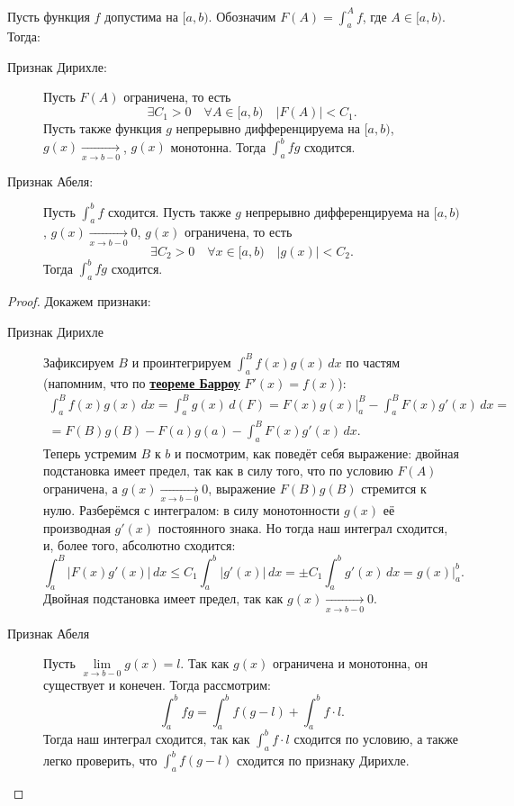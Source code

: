 \begin{theorem}
	Пусть функция \(f\) допустима на \([a, b)\). Обозначим \(F(A) = \int_a^A f\), где \(A \in [a, b)\). Тогда:
	\begin{description}
		\item[Признак Дирихле:] Пусть \(F(A)\) ограничена, то есть \[
			\exists C_1 > 0 \quad \forall A \in [a, b) \quad |F(A)| < C_1.
		\]
		Пусть также функция \(g\) непрерывно дифференцируема на \([a, b)\), \(g(x) \xrightarrow[x \to b-0]{}\), \(g(x)\) монотонна. Тогда \(\int_a^b fg\) сходится.
		\item[Признак Абеля:] Пусть \(\int_a^b f\) сходится. Пусть также \(g\) непрерывно дифференцируема на \([a, b)\), \(g(x) \xrightarrow[x \to b-0]{} 0\), \(g(x)\) ограничена, то есть \[
			\exists C_2 > 0 \quad \forall x \in [a, b) \quad |g(x)| < C_2.
		\]
		Тогда \(\int_a^b fg\) сходится. 
	\end{description} 
\end{theorem}
\begin{proof}
	Докажем признаки:
	\begin{description}
		\item[Признак Дирихле] Зафиксируем \(B\) и проинтегрируем \(\displaystyle \int_a^B f(x)g(x) \, dx\) по частям (напомним, что по \hyperlink{t8}{\bfseries теореме Барроу} \(F'(x) = f(x)\)):
		\begin{multline*}
			\int_a^B f(x)g(x) \, dx = \int_a^B g(x) \, d(F) = F(x)g(x) \bigg|_a^B -\int_a^B F(x)g'(x) \, dx = \\
			= F(B)g(B) - F(a)g(a) - \int_a^B F(x)g'(x) \, dx.
		\end{multline*}
		Теперь устремим \(B\) к \(b\) и посмотрим, как поведёт себя выражение: двойная подстановка имеет предел, так как в силу того, что по условию \(F(A)\) ограничена, а \(g(x) \xrightarrow[x \to b-0]{} 0\), выражение \(F(B)g(B)\) стремится к нулю. Разберёмся с интегралом: в силу монотонности \(g(x)\) её производная \(g'(x)\) постоянного знака. Но тогда наш интеграл сходится, и, более того, абсолютно сходится: \[
			\int_a^B |F(x)g'(x)| \, dx \leqslant C_1 \int_a^b |g'(x)| \, dx = \pm C_1 \int_a^b g'(x) \, dx = g(x) \bigg|_a^b.
		\]
		Двойная подстановка имеет предел, так как \(g(x) \xrightarrow[x \to b-0]{} 0\).
		\item[Признак Абеля] Пусть \(\lim\limits_{x \to b-0} g(x) = l\). Так как \(g(x)\) ограничена и монотонна, он существует и конечен. Тогда рассмотрим: \[
			\int_a^b fg = \int_a^b f(g - l) + \int_a^b f \cdot l.
		\]
		Тогда наш интеграл сходится, так как \(\int_a^b f \cdot l\) сходится по условию, а также легко проверить, что \(\int_a^b f(g - l)\) сходится по признаку Дирихле.
	\end{description}
\end{proof}

